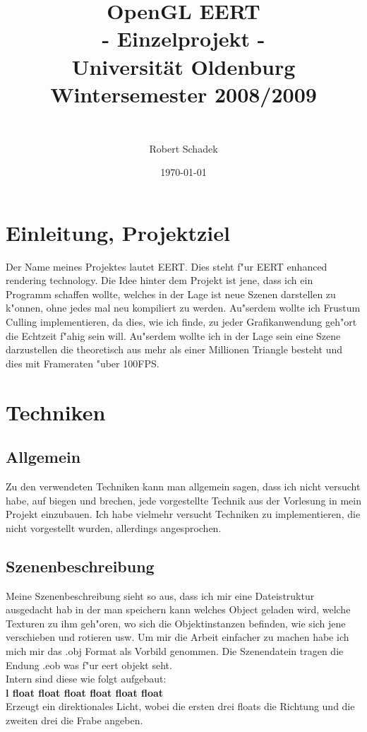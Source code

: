 \documentclass[a4paper,titlepage]{article}
\title{
	{\huge OpenGL EERT\\
	\huge - Einzelprojekt -\\
	{\large Universit\"at Oldenburg}\\
	\large Wintersemester 2008/2009\\
	}
	\date{\today}
	\author{\\
		\large 	Robert Schadek\\
	}
}
\begin{document}
\maketitle
\tableofcontents
\section{Einleitung, Projektziel}
Der Name meines Projektes lautet EERT. Dies steht f"ur EERT enhanced rendering technology.
Die Idee hinter dem Projekt ist jene, dass ich ein Programm schaffen wollte, welches in der Lage ist
neue Szenen darstellen zu k"onnen, ohne jedes mal neu kompiliert zu werden. Au"serdem wollte ich Frustum 
Culling implementieren, da dies, wie ich finde, zu jeder Grafikanwendung geh"ort die Echtzeit f"ahig 
sein will. Au"serdem wollte ich in der Lage sein eine Szene darzustellen die theoretisch aus mehr als einer
Millionen Triangle besteht und dies mit Frameraten "uber 100FPS.\\

\section{Techniken}
\subsection{Allgemein}
Zu den verwendeten Techniken kann man allgemein sagen, dass ich nicht versucht habe, auf biegen und brechen, 
jede vorgestellte Technik aus der Vorlesung in mein Projekt einzubauen. Ich habe vielmehr versucht Techniken 
zu implementieren, die nicht vorgestellt wurden, allerdings angesprochen.

\subsection{Szenenbeschreibung}
Meine Szenenbeschreibung sieht so aus, dass ich mir eine Dateistruktur ausgedacht hab in der man speichern 
kann welches Object geladen wird, welche Texturen zu ihm geh"oren, wo sich die Objektinstanzen befinden, wie 
sich jene verschieben und rotieren usw. Um mir die Arbeit einfacher zu machen habe ich mich mir das .obj Format 
als Vorbild genommen. Die Szenendatein tragen die Endung .eob was f"ur eert objekt seht.\\
Intern sind diese wie folgt aufgebaut:\\

\textbf{l float float float float float float}\\
Erzeugt ein direktionales Licht, wobei die ersten drei floats die Richtung und die zweiten drei die Frabe angeben.\\
\end{document}
